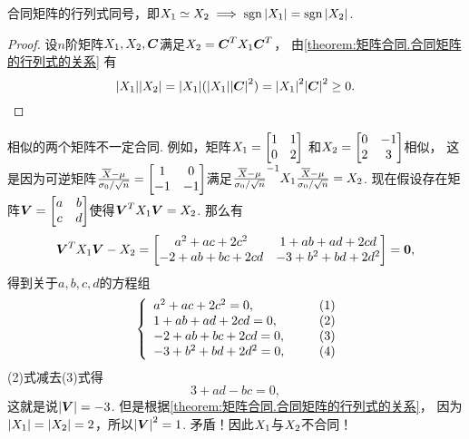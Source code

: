 \begin{proposition}
合同矩阵的行列式同号，即\(X_1\simeq X_2\implies\operatorname{sgn}\abs{X_1}=\operatorname{sgn}\abs{X_2}\).
\begin{proof}
设\(n\)阶矩阵\(X_1,X_2,\boldsymbol{C}\)满足\(X_2=\boldsymbol{C}^TX_1\boldsymbol{C}^T\)，
由\cref{theorem:矩阵合同.合同矩阵的行列式的关系} 有\[
	\abs{X_1}\abs{X_2}
	=\abs{X_1}(\abs{X_1}\abs{\boldsymbol{C}}^2)
	=\abs{X_1}^2\abs{\boldsymbol{C}}^2 \geq 0.
	\qedhere
\]
\end{proof}
\end{proposition}

\begin{example}
相似的两个矩阵不一定合同.
例如，矩阵\(X_1=\begin{bmatrix}
	1 & 1 \\
	0 & 2
\end{bmatrix}\)
和\(X_2=\begin{bmatrix}
	0 & -1 \\
	2 & 3
\end{bmatrix}\)相似，
这是因为可逆矩阵\(\P=\begin{bmatrix}
	1 & 0 \\
	-1 & -1
\end{bmatrix}\)满足\(\P^{-1}\A\P=\B\).
现在假设存在矩阵\(\Q=\begin{bmatrix}
	a & b \\
	c & d
\end{bmatrix}\)使得\(\Q^T\A\Q=\B\).
那么有\[
	\Q^T\A\Q-\B
	=\begin{bmatrix}
		a^2+ac+2c^2 & 1+ab+ad+2cd \\
		-2+ab+bc+2cd & -3+b^2+bd+2d^2
	\end{bmatrix}
	=\vb0,
\]
得到关于\(a,b,c,d\)的方程组
\begin{align*}
	\left\{ \begin{array}{l}
		a^2+ac+2c^2 = 0, \\
		1+ab+ad+2cd = 0, \\
		-2+ab+bc+2cd = 0, \\
		-3+b^2+bd+2d^2 = 0,
	\end{array} \right.
	\tag*{$\begin{matrix}(1)\\(2)\\(3)\\(4)\end{matrix}$}
\end{align*}
(2)式减去(3)式得\[
	3+ad-bc=0,
\]
这就是说\(\abs{\Q}=-3\).
但是根据\cref{theorem:矩阵合同.合同矩阵的行列式的关系}，
因为\(\abs{X_1}=\abs{X_2}=2\)，所以\(\abs{\Q}^2=1\).
矛盾！因此\(X_1\)与\(X_2\)不合同！
\end{example}

